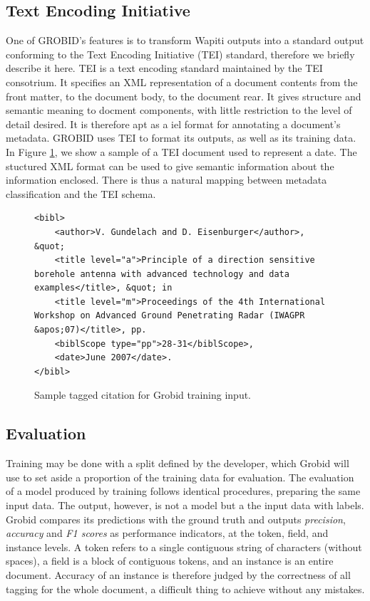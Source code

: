 \subsection{Text Encoding Initiative}
\label{subsec:tei}
One of GROBID's features is to transform Wapiti outputs into a standard output conforming to the Text Encoding Initiative (TEI) standard, therefore we briefly describe it here. TEI is a text encoding standard maintained by the TEI consotrium. It specifies an XML representation of a document contents from the front matter, to the document body, to the document rear. It gives structure and semantic meaning to docment components, with little restriction to the level of detail desired. It is therefore apt as a iel format for annotating a document's metadata. GROBID uses TEI to format its outputs, as well as its training data. In Figure \ref{fig:tei}, we show a sample of a TEI document used to represent a date. The stuctured XML format can be used to give semantic information about the information enclosed. There is thus a natural mapping between metadata classification and the TEI schema.

\begin{figure}
\lstset{language=XML}
\begin{lstlisting}
<bibl>
    <author>V. Gundelach and D. Eisenburger</author>, &quot; 
    <title level="a">Principle of a direction sensitive borehole antenna with advanced technology and data examples</title>, &quot; in 
    <title level="m">Proceedings of the 4th International Workshop on Advanced Ground Penetrating Radar (IWAGPR &apos;07)</title>, pp. 
    <biblScope type="pp">28-31</biblScope>, 
    <date>June 2007</date>.
</bibl>
\end{lstlisting}
\caption{Sample tagged citation for Grobid training input.}
\label{fig:tei}
\end{figure}

\subsection{Evaluation}

Training may be done with a split defined by the developer, which Grobid will use to set aside a proportion of the training data for evaluation. The evaluation of a model produced by training follows identical procedures, preparing the same input data. The output, however, is not a model but a the input data with labels. Grobid compares its predictions with the ground truth and outputs \emph{precision}, \emph{accuracy} and \emph{F1 scores} as performance indicators, at the token, field, and instance levels. A token refers to a single contiguous string of characters (without spaces), a field is a block of contiguous tokens, and an instance is an entire document. Accuracy of an instance is therefore judged by the correctness of all tagging for the whole document, a difficult thing to achieve without any mistakes.

